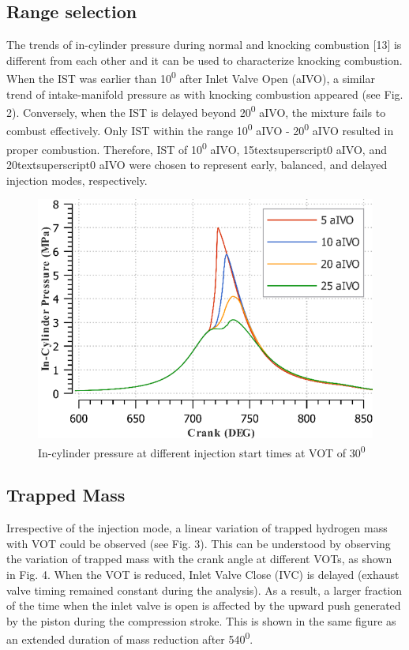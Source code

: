 \documentclass[conference]{IEEEtran}
\begin{document}
\subsection{Range selection}
The trends of in-cylinder pressure during normal and knocking combustion [13] is different from each other and it can be used to characterize knocking combustion. 
When the IST was earlier than 10\textsuperscript{0} after Inlet Valve Open (aIVO), a similar trend of intake-manifold pressure as with knocking combustion appeared (see Fig. 2). 
Conversely, when the IST is delayed beyond 20\textsuperscript{0} aIVO, the mixture fails to combust effectively. 
Only IST within the range 10\textsuperscript{0} aIVO - 20\textsuperscript{0} aIVO resulted in proper combustion. 
Therefore, IST of 10\textsuperscript{0} aIVO, 15textsuperscript{0} aIVO, and 20textsuperscript{0} aIVO were chosen to represent early, balanced, and delayed injection modes, respectively.

\begin{figure}[htbp]
    \centerline{\includegraphics{plots and graphs/2.png}}
    \caption{In-cylinder pressure at different injection start times at VOT of 30\textsuperscript{0}}
    \label{plt_2}
    \end{figure}


\subsection{Trapped Mass}
Irrespective of the injection mode, a linear variation of trapped hydrogen mass with VOT could be observed (see Fig. 3). 
This can be understood by observing the variation of trapped mass with the crank angle at different VOTs, as shown in Fig. 4. 
When the VOT is reduced, Inlet Valve Close (IVC) is delayed (exhaust valve timing remained constant during the analysis). 
As a result, a larger fraction of the time when the inlet valve is open is affected by the upward push generated by the piston during the compression stroke. 
This is shown in the same figure as an extended duration of mass reduction after 540\textsuperscript{0}.
\end{document}
